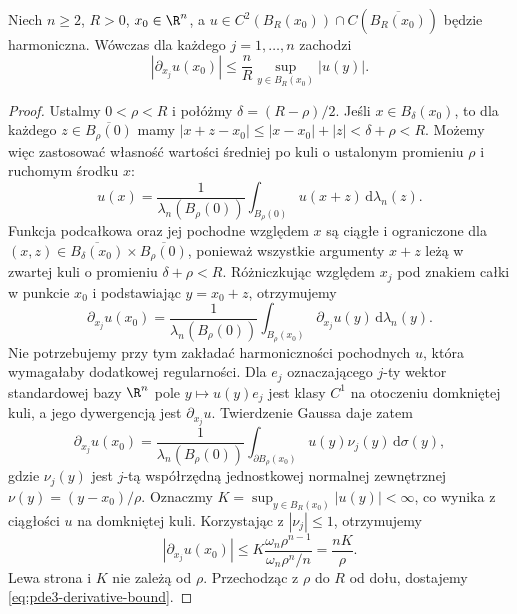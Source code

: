 \begin{stwierdzenie}
\label{prop:pde3-gradient}
Niech $n\geq2$, $R>0$, $x_0\in\R^n$,
a $u\in C^2(B_R(x_0))\cap C(\overline{B_R(x_0)})$
będzie harmoniczna. Wówczas dla każdego
$j=1,\dots,n$ zachodzi
\begin{equation}\label{eq:pde3-derivative-bound}
 |\partial_{x_j}u(x_0)|\leq \frac nR
 \sup_{y\in B_R(x_0)}|u(y)|.
\end{equation}
\end{stwierdzenie}
\begin{proof}
Ustalmy $0<\rho<R$ i połóżmy $\delta=(R-\rho)/2$.
Jeśli $x\in B_\delta(x_0)$, to dla każdego
$z\in\overline{B_\rho(0)}$ mamy
$|x+z-x_0|\leq|x-x_0|+|z|<\delta+\rho<R$.
Możemy więc zastosować własność wartości średniej
po kuli o ustalonym promieniu $\rho$ i ruchomym środku $x$:
\[
 u(x)=\frac{1}{\lambda_n(B_\rho(0))}
 \int_{B_\rho(0)}u(x+z)\,\mathrm d\lambda_n(z).
\]
Funkcja podcałkowa oraz jej pochodne względem $x$
są ciągłe i ograniczone dla
$(x,z)\in\overline{B_\delta(x_0)}\times
\overline{B_\rho(0)}$, ponieważ wszystkie argumenty $x+z$
leżą w zwartej kuli o promieniu $\delta+\rho<R$.
Różniczkując względem $x_j$ pod znakiem całki
w punkcie $x_0$ i podstawiając $y=x_0+z$, otrzymujemy
\[
 \partial_{x_j}u(x_0)
 =\frac{1}{\lambda_n(B_\rho(0))}
 \int_{B_\rho(x_0)}\partial_{x_j}u(y)\,
 \mathrm d\lambda_n(y).
\]
Nie potrzebujemy przy tym zakładać harmoniczności
pochodnych $u$, która wymagałaby dodatkowej regularności.
Dla $e_j$ oznaczającego $j$-ty wektor standardowej
bazy $\R^n$ pole $y\mapsto u(y)e_j$ jest klasy $C^1$
na otoczeniu domkniętej kuli, a jego dywergencją jest
$\partial_{x_j}u$. Twierdzenie Gaussa daje zatem
\[
 \partial_{x_j}u(x_0)=\frac{1}{\lambda_n(B_\rho(0))}
 \int_{\partial B_\rho(x_0)}u(y)\nu_j(y)\,
 \mathrm d\sigma(y),
\]
gdzie $\nu_j(y)$ jest $j$-tą współrzędną jednostkowej
normalnej zewnętrznej $\nu(y)=(y-x_0)/\rho$.
Oznaczmy $K=\sup_{y\in B_R(x_0)}|u(y)|<\infty$,
co wynika z ciągłości $u$ na domkniętej kuli.
Korzystając z $|\nu_j|\leq1$, otrzymujemy
\[
 |\partial_{x_j}u(x_0)|
 \leq K\frac{\omega_n\rho^{n-1}}{\omega_n\rho^n/n}
 =\frac{nK}{\rho}.
\]
Lewa strona i $K$ nie zależą od $\rho$. Przechodząc
z $\rho$ do $R$ od dołu, dostajemy
\eqref{eq:pde3-derivative-bound}.
\end{proof}

